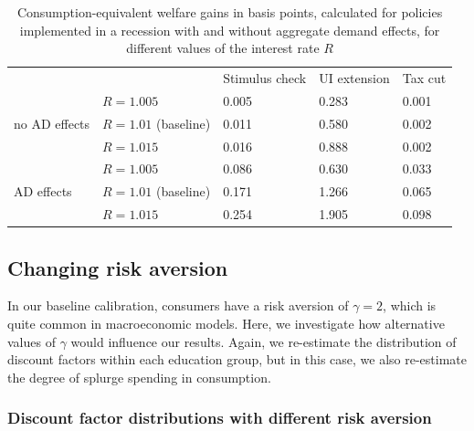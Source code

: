 \documentclass[\econtexRoot/HAFiscal]{subfiles}
\begin{document}
\begin{table}[]
  \begin{center}
    \begin{tabular}{@{}lllll@{}}
      \toprule
      &                    & Stimulus check & UI extension & Tax cut \\ \cmidrule(l){1-5} 
      \multirow{3}{*}{no AD effects}            	& $R = 1.005$ 			& 0.005        & 0.283       & 0.001	\\
      & $R = 1.01$ (baseline) & 0.011        & 0.580       & 0.002   	\\
      & $R = 1.015$ 			& 0.016        & 0.888       & 0.002   	\\ \cmidrule(l){1-5}
      \multirow{3}{*}{AD effects}					& $R = 1.005$    		& 0.086        & 0.630       & 0.033  	\\		
      & $R = 1.01$ (baseline) & 0.171        & 1.266       & 0.065   	\\
      & $R = 1.015$    		& 0.254        & 1.905       & 0.098    \\ \cmidrule(l){1-5} 
    \end{tabular}
    \caption{Consumption-equivalent welfare gains in basis points, calculated for policies implemented in a recession with and without aggregate demand effects, for different values of the interest rate $R$}
    \notinsubfile{\label{tab:robustness_R_results}}
  \end{center}
\end{table}


\FloatBarrier
\hypertarget{changing-risk-aversion}{}
\subsection{Changing risk aversion} 
\notinsubfile{\label{sec:robust_gamma}} 

In our baseline calibration, consumers have a risk aversion of $\gamma=2$, which is quite common in macroeconomic models. Here, we investigate how alternative values of $\gamma$ would influence our results. Again, we re-estimate the distribution of discount factors within each education group, but in this case, we also re-estimate the degree of splurge spending in consumption. 

\subsubsection{Discount factor distributions with different risk aversion}
\notinsubfile{\label{sec:robust_gamma_estim}}
\end{document}
